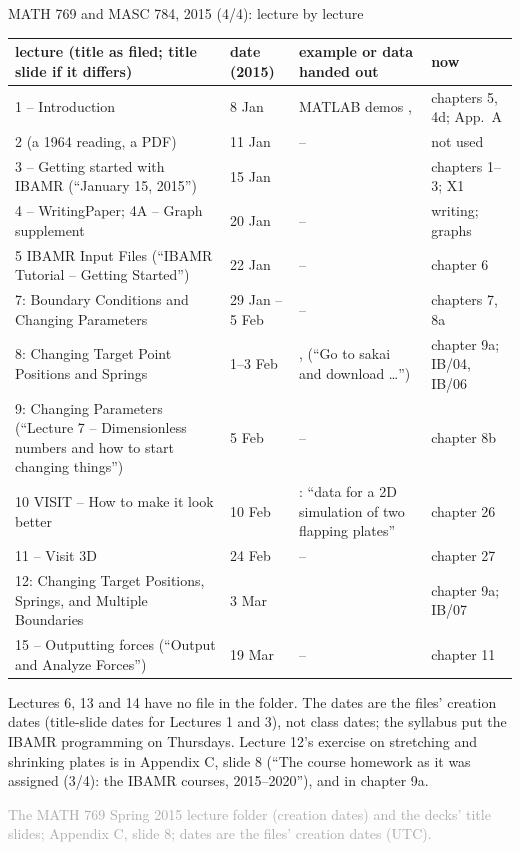 \documentclass[aspectratio=169,11pt]{beamer}
\newcommand{\sourcecredit}[1]{\vfill\begin{flushright}\tiny\textcolor{DarkGray}{#1}\end{flushright}}
\begin{document}
\begin{frame}{MATH 769 and MASC 784, 2015 (4/4): lecture by lecture}
\label{fr:m769d}
\tiny
\renewcommand{\arraystretch}{1.12}
\setlength{\tabcolsep}{3pt}
\begin{tabular}{@{}L{0.36\textwidth}L{0.1\textwidth}L{0.3\textwidth}L{0.17\textwidth}@{}}
\toprule
lecture (title as filed; title slide if it differs) & date (2015) & example or data handed out & now \\
 -- Introduction & 8 Jan & MATLAB demos ,  & chapters 5, 4d; App.~A \\
2 (a 1964 reading, a PDF) & 11 Jan & -- & not used \\
3 -- Getting started with IBAMR (``January 15, 2015'') & 15 Jan &  & chapters 1--3; X1 \\
4 -- WritingPaper; 4A -- Graph supplement & 20 Jan & -- & writing; graphs \\
5 IBAMR Input Files (``IBAMR Tutorial -- Getting Started'') & 22 Jan & -- & chapter 6 \\
7: Boundary Conditions and Changing Parameters & 29 Jan -- 5 Feb & -- & chapters 7, 8a \\
8: Changing Target Point Positions and Springs & 1--3 Feb & ,  (``Go to sakai and download \ldots'') & chapter 9a; IB/04, IB/06 \\
9: Changing Parameters (``Lecture 7 -- Dimensionless numbers and how to start changing things'') & 5 Feb & -- & chapter 8b \\
10 VISIT -- How to make it look better & 10 Feb & : ``data for a 2D simulation of two flapping plates'' & chapter 26 \\
11 -- Visit 3D & 24 Feb & -- & chapter 27 \\
12: Changing Target Positions, Springs, and Multiple Boundaries & 3 Mar &  & chapter 9a; IB/07 \\
15 -- Outputting forces (``Output and Analyze Forces'') & 19 Mar & -- & chapter 11 \\
\bottomrule
\end{tabular}

\vspace{2mm}
\footnotesize Lectures 6, 13 and 14 have no file in the folder. The dates are the files' creation dates (title-slide dates for Lectures 1 and 3), not class dates; the syllabus put the IBAMR programming on Thursdays. Lecture 12's exercise on stretching and shrinking plates is in Appendix C, slide 8 (``The course homework as it was assigned (3/4): the IBAMR courses, 2015--2020''), and in chapter 9a.
\sourcecredit{The MATH 769 Spring 2015 lecture folder (creation dates) and the decks' title slides; Appendix C, slide 8; dates are the files' creation dates (UTC).}
\end{frame}
\end{document}
